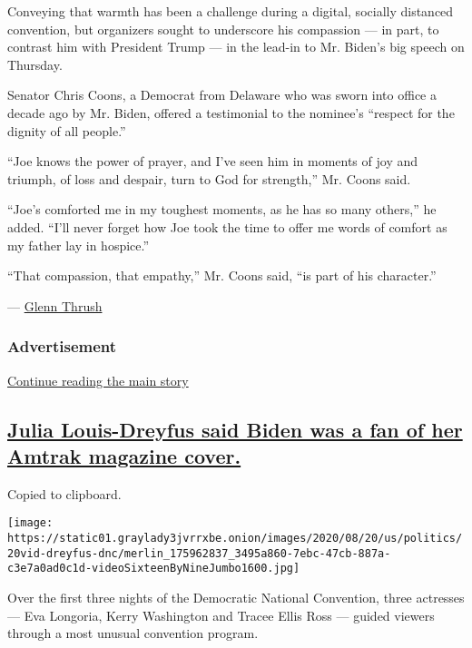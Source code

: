 Conveying that warmth has been a challenge during a digital, socially
distanced convention, but organizers sought to underscore his compassion
--- in part, to contrast him with President Trump --- in the lead-in to
Mr. Biden's big speech on Thursday.

Senator Chris Coons, a Democrat from Delaware who was sworn into office
a decade ago by Mr. Biden, offered a testimonial to the nominee's
``respect for the dignity of all people.''

``Joe knows the power of prayer, and I've seen him in moments of joy and
triumph, of loss and despair, turn to God for strength,'' Mr. Coons
said.

``Joe's comforted me in my toughest moments, as he has so many others,''
he added. ``I'll never forget how Joe took the time to offer me words of
comfort as my father lay in hospice.''

``That compassion, that empathy,'' Mr. Coons said, ``is part of his
character.''

--- \href{https://www.nytimes3xbfgragh.onion/by/glenn-thrush}{Glenn
Thrush}

\hypertarget{advertisement-6}{%
\subsubsection{Advertisement}\label{advertisement-6}}

\protect\hyperlink{after-dfp-ad-mid7}{Continue reading the main story}

\hypertarget{julia-louis-dreyfus-said-biden-was-a-fan-of-her-amtrak-magazine-cover}{%
\subsection{\texorpdfstring{\protect\hyperlink{julia-louis-dreyfus-said-biden-was-a-fan-of-her-amtrak-magazine-cover}{Julia
Louis-Dreyfus said Biden was a fan of her Amtrak magazine
cover.}}{Julia Louis-Dreyfus said Biden was a fan of her Amtrak magazine cover.}}\label{julia-louis-dreyfus-said-biden-was-a-fan-of-her-amtrak-magazine-cover}}

Copied to clipboard.

\texttt{[image: https://static01.graylady3jvrrxbe.onion/images/2020/08/20/us/politics/20vid-dreyfus-dnc/merlin\_175962837\_3495a860-7ebc-47cb-887a-c3e7a0ad0c1d-videoSixteenByNineJumbo1600.jpg]}

Over the first three nights of the Democratic National Convention, three
actresses --- Eva Longoria, Kerry Washington and Tracee Ellis Ross ---
guided viewers through a most unusual convention program.

